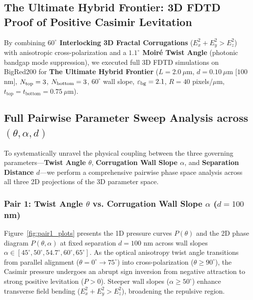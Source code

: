 \documentclass[12pt,letterpaper]{article}
\begin{document}
\subsection{The Ultimate Hybrid Frontier: 3D FDTD Proof of Positive Casimir Levitation}
\label{sec:hybrid_frontier}
By combining \textbf{$60^\circ$ Interlocking 3D Fractal Corrugations} ($E_x^2 + E_y^2 > E_z^2$) with anisotropic cross-polarization and a \textbf{$1.1^\circ$ Moir\'e Twist Angle} (photonic bandgap mode suppression), we executed full 3D FDTD simulations on BigRed200 for \textbf{The Ultimate Hybrid Frontier} ($L = 2.0\ \mu\text{m}$, $d = 0.10\ \mu\text{m}$ [$100$ nm], $N_{\rm top} = 3$, $N_{\rm bottom} = 3$, $60^\circ$ wall slope, $\varepsilon_{\rm bg} = 2.1$, $R = 40$ pixels/$\mu\text{m}$, $t_{\text{top}} = t_{\text{bottom}} = 0.75\ \mu\text{m}$).

\subsection{Full Pairwise Parameter Sweep Analysis across $(\theta, \alpha, d)$}
\label{sec:pairwise_analysis}
To systematically unravel the physical coupling between the three governing parameters---\textbf{Twist Angle $\theta$}, \textbf{Corrugation Wall Slope $\alpha$}, and \textbf{Separation Distance $d$}---we perform a comprehensive pairwise phase space analysis across all three 2D projections of the 3D parameter space.

\subsubsection{Pair 1: Twist Angle $\theta$ vs. Corrugation Wall Slope $\alpha$ ($d = 100$ nm)}
Figure~\ref{fig:pair1_plots} presents the 1D pressure curves $P(\theta)$ and the 2D phase diagram $P(\theta, \alpha)$ at fixed separation $d = 100$ nm across wall slopes $\alpha \in [45^\circ, 50^\circ, 54.7^\circ, 60^\circ, 65^\circ]$. As the optical anisotropy twist angle transitions from parallel alignment ($\theta = 0^\circ \to 75^\circ$) into cross-polarization ($\theta \ge 90^\circ$), the Casimir pressure undergoes an abrupt sign inversion from negative attraction to strong positive levitation ($P > 0$). Steeper wall slopes ($\alpha \ge 50^\circ$) enhance transverse field bending ($E_x^2 + E_y^2 > E_z^2$), broadening the repulsive region.
\end{document}
